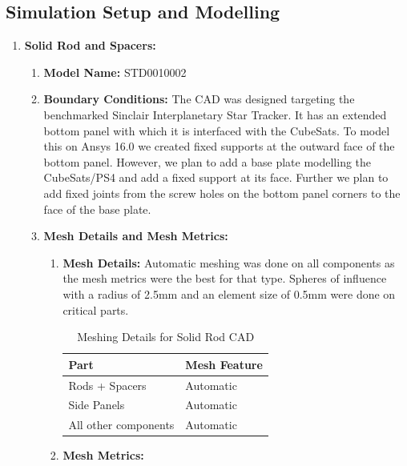 \documentclass[../../main.tex]{subfiles}
\begin{document}
\subsection{Simulation Setup and Modelling }
    \begin{enumerate}
        \item \textbf{Solid Rod and Spacers:}
        \begin{enumerate}
            \item \textbf{Model Name:} STD0010002
            \item \textbf{Boundary Conditions:} The CAD was designed targeting the benchmarked Sinclair Interplanetary Star Tracker. It has an extended bottom panel with which it is interfaced with the CubeSats. To model this on Ansys 16.0 we created fixed supports at the outward face of the bottom panel. However, we plan to add a base plate modelling the CubeSats/PS4 and add a fixed support at its face. Further we plan to add fixed joints from the screw holes on the bottom panel corners to the face of the base plate.
            \item \textbf{Mesh Details and Mesh Metrics:}
            \begin{enumerate}
                \item \textbf{Mesh Details: }Automatic meshing was done on all components as the mesh metrics were the best for that type. Spheres of influence with a radius of 2.5mm and an element size of 0.5mm were done on critical parts. 
                \begin{table}[H]
                    \centering
                    \begin{tabular}{|p{3cm}|p{3cm}|}
                    \hline
                    \textbf{Part} & \textbf{Mesh Feature} \\
                    \hline
                    Rods + Spacers & Automatic \\
                    \hline
                    Side Panels & Automatic \\
                    \hline
                    All other components & Automatic \\
                    \hline
                \end{tabular}
                \caption{Meshing Details for Solid Rod CAD}
                \label{tab:my_label}
            \end{table}
                \item \textbf{Mesh Metrics:}
                \begin{table}[H]

\end{table}
\end{enumerate}
\end{enumerate}
\end{enumerate}
\end{document}
